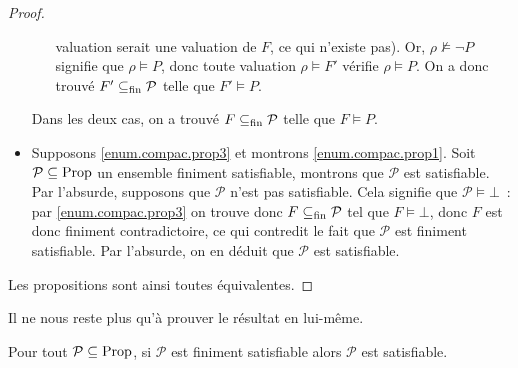 \begin{proof}
\begin{itemize}
\begin{itemize}
      valuation serait une valuation de $F$, ce qui n'existe pas). Or,
      $\rho\not\models \lnot P$ signifie que $\rho\models P$, donc toute
      valuation $\rho\models F'$ vérifie $\rho\models P$. On a donc trouvé
      $F'\subseteq_{\mathrm{fin}} \mathcal P$ telle que $F'\vDash P$.
    \end{itemize}
    Dans les deux cas, on a trouvé $F\subseteq_{\mathrm{fin}} \mathcal P$ telle que $F\vDash P$.
  \item Supposons \ref{enum.compac.prop3} et montrons \ref{enum.compac.prop1}.
    Soit $\mathcal P\subseteq\operatorname{Prop}$ un ensemble finiment satisfiable, montrons
    que $\mathcal P$ est satisfiable. Par l'absurde, supposons que $\mathcal P$
    n'est pas satisfiable. Cela signifie que $\mathcal P\vDash \bot$~: par
    \ref{enum.compac.prop3} on trouve donc $F\subseteq_{\mathrm{fin}} \mathcal P$ tel que
    $F\vDash \bot$, donc $F$ est donc finiment contradictoire, ce qui contredit
    le fait que $\mathcal P$ est finiment satisfiable. Par l'absurde, on en
    déduit que $\mathcal P$ est satisfiable.
  \end{itemize}

  Les propositions sont ainsi toutes équivalentes.
\end{proof}

Il ne nous reste plus qu'à prouver le résultat en lui-même.

\begin{theorem}\label{thm.compac.prop}
  Pour tout $\mathcal P\subseteq\operatorname{Prop}$, si $\mathcal P$ est finiment satisfiable
  alors $\mathcal P$ est satisfiable.
\end{theorem}

